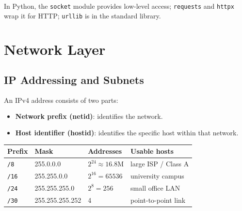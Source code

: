 \documentclass[oneside]{book}
\begin{document}
In Python, the \texttt{socket} module provides low-level access; \texttt{requests}
and \texttt{httpx} wrap it for HTTP; \texttt{urllib} is in the standard library.

\chapter{Network Layer}

\section{IP Addressing and Subnets}


An IPv4 address consists of two parts:
\begin{itemize}
    \item \textbf{Network prefix (netid)}: identifies the network.
    \item \textbf{Host identifier (hostid)}: identifies the specific host within that network.
\end{itemize}


\begin{center}
\begin{tabularx}{\linewidth}{llll}
\toprule
\textbf{Prefix} & \textbf{Mask} & \textbf{Addresses} & \textbf{Usable hosts} \\
\midrule
\texttt{/8}  & 255.0.0.0     & $2^{24} \approx 16.8$M & large ISP / Class A \\
\texttt{/16} & 255.255.0.0   & $2^{16} = 65536$       & university campus \\
\texttt{/24} & 255.255.255.0 & $2^{8} = 256$          & small office LAN \\
\texttt{/30} & 255.255.255.252 & 4                    & point-to-point link \\
\bottomrule
\end{tabularx}
\end{center}
\end{document}
